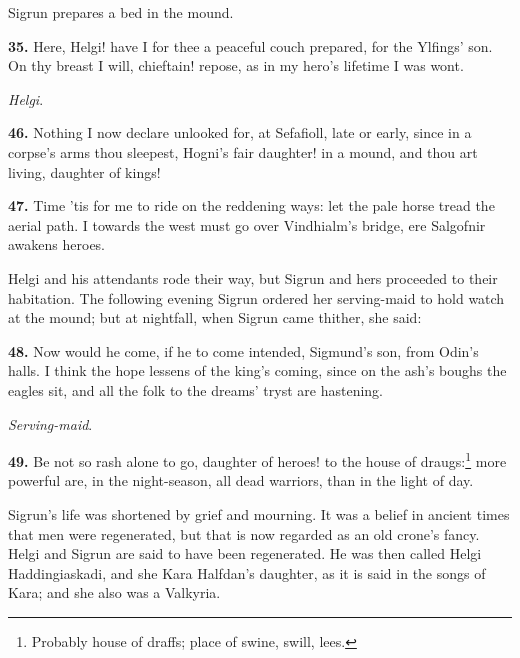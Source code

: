 Sigrun prepares a bed in the mound.

\textbf{35.} Here, Helgi! have I for thee a peaceful couch prepared, for the
Ylfings' son. On thy breast I will, chieftain! repose, as in my hero's
lifetime I was wont.

\emph{Helgi}.

\textbf{46.} Nothing I now declare unlooked for, at Sefafioll, late or early,
since in a corpse's arms thou sleepest, Hogni's fair daughter! in a
mound, and thou art living, daughter of kings!

\textbf{47.} Time 'tis for me to ride on the reddening ways: let the pale
horse tread the aerial path. I towards the west must go over
Vindhialm's bridge, ere Salgofnir awakens heroes.

Helgi and his attendants rode their way, but Sigrun and hers proceeded
to their habitation. The following evening Sigrun ordered her
serving-maid to hold watch at the mound; but at nightfall, when Sigrun
came thither, she said:

\textbf{48.} Now would he come, if he to come intended, Sigmund's son, from
Odin's halls. I think the hope lessens of the king's coming, since on
the ash's boughs the eagles sit, and all the folk to the dreams' tryst
are hastening.

\emph{Serving-maid}.

\textbf{49.} Be not so rash alone to go, daughter of heroes! to the house of
draugs:\footnote{Probably house of draffs; place of swine, swill, lees.} more powerful are, in the night-season, all dead warriors,
than in the light of day.

Sigrun's life was shortened by grief and mourning. It was a belief in
ancient times that men were regenerated, but that is now regarded as
an old crone's fancy. Helgi and Sigrun are said to have been
regenerated. He was then called Helgi Haddingiaskadi, and she Kara
Halfdan's daughter, as it is said in the songs of Kara; and she also
was a Valkyria.


